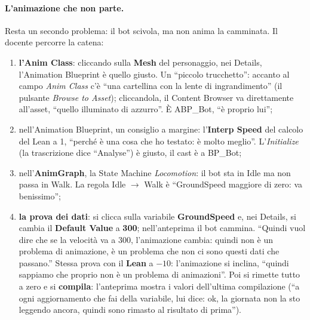 \paragraph{L'animazione che non parte.} Resta un secondo problema: il bot scivola, ma non
anima la camminata. Il docente percorre la catena:
\begin{enumerate}
  \item \textbf{l'Anim Class}: cliccando sulla \textbf{Mesh} del personaggio, nei Details,
        l'Animation Blueprint è quello giusto. Un ``piccolo trucchetto'': accanto al
        campo \emph{Anim Class} c'è ``una cartellina con la lente di ingrandimento'' (il
        pulsante \emph{Browse to Asset}); cliccandola, il Content Browser va direttamente
        all'asset, ``quello illuminato di azzurro''. È ABP\_Bot, ``è proprio lui'';
  \item nell'Animation Blueprint, un consiglio a margine: l'\textbf{Interp Speed} del
        calcolo del Lean a 1, ``perché è una cosa che ho testato: è molto meglio''.
        L'\emph{Initialize} (la trascrizione dice ``Analyse'') è giusto, il cast è a
        BP\_Bot;
  \item nell'\textbf{AnimGraph}, la State Machine \emph{Locomotion}: il bot sta in Idle
        ma non passa in Walk. La regola Idle $\rightarrow$ Walk è ``GroundSpeed maggiore
        di zero: va benissimo'';
  \item \textbf{la prova dei dati}: si clicca sulla variabile \textbf{GroundSpeed} e, nei
        Details, si cambia il \textbf{Default Value} a \textbf{300}; nell'anteprima il bot
        cammina. ``Quindi vuol dire che se la velocità va a 300, l'animazione cambia:
        quindi non è un problema di animazione, è un problema che non ci sono questi dati
        che passano.'' Stessa prova con il \textbf{Lean} a $-10$: l'animazione si inclina,
        ``quindi sappiamo che proprio non è un problema di animazioni''. Poi si rimette
        tutto a zero e si \textbf{compila}: l'anteprima mostra i valori dell'ultima
        compilazione (``a ogni aggiornamento che fai della variabile, lui dice: ok, la
        giornata non la sto leggendo ancora, quindi sono rimasto al risultato di prima'').
\end{enumerate}


